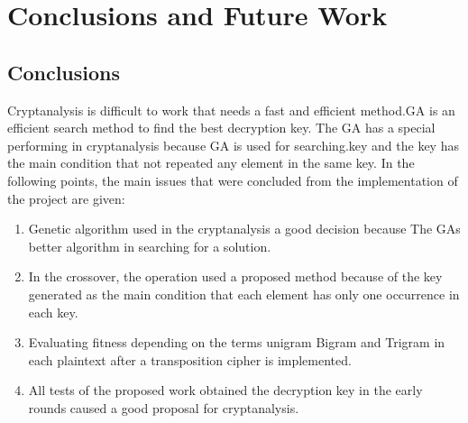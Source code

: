 \chapter{Conclusions and Future Work}
\section{Conclusions}
Cryptanalysis is difficult to work that needs a fast and efficient method.GA is an efficient search method to find the best decryption key. The GA has a special performing in cryptanalysis because GA is used for searching.key and the key has the main condition that not repeated any element in the same key.
In the following points, the main issues that were concluded from the
implementation of the project are given:
\begin{enumerate}
    \item{Genetic algorithm used in the cryptanalysis a good decision because The GAs better algorithm in searching for a solution.}
    \item {In the crossover, the operation used a proposed method because of the key generated as the main condition that each element has only one occurrence in each key.}
    \item { Evaluating fitness depending on the terms unigram Bigram and Trigram in each plaintext after a transposition cipher is implemented.}
    \item {All tests of the proposed work obtained the decryption key in the early rounds caused a good proposal for cryptanalysis.}

\end{enumerate}